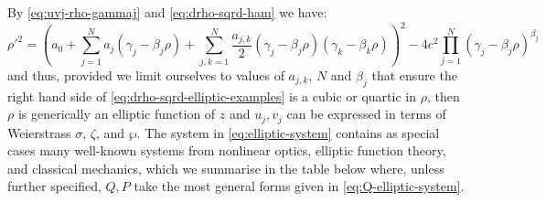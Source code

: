 \documentclass[11pt,a4paper]{article}
\numberwithin{equation}{section}
\begin{document}
By \eqref{eq:uvj-rho-gammaj} and \eqref{eq:drho-sqrd-ham} we have:
\begin{equation}
    \label{eq:drho-sqrd-elliptic-examples}
    \rho'^{2} = \left({a}_{0} + \sum_{j=1}^{N} {a}_{j}\left({\gamma}_{j} - {\beta}_{j} \rho\right) + \sum_{j,k=1}^N \frac{{a}_{j,k}}{2}\left({\gamma}_{j} - {\beta}_{j} \rho\right) \left({\gamma}_{k} - {\beta}_{k} \rho\right) \right)^{2} - 4 c^{2} \prod_{j=1}^{N} \left({\gamma}_{j} - {\beta}_{j} \rho\right)^{{\beta}_{j}}
\end{equation}
and thus, provided we limit ourselves to values of $a_{j,k}$, $N$ and $\beta_j$ that ensure the right hand side of \eqref{eq:drho-sqrd-elliptic-examples} is a cubic or quartic in $\rho$, then $\rho$ is generically an elliptic function of $z$ and $u_j, v_j$ can be expressed in terms of Weierstrass $\sigma$, $\zeta$, and $\wp$. 
The system in \eqref{eq:elliptic-system} contains as special cases many well-known systems from nonlinear optics, elliptic function theory, and classical mechanics, which we summarise in the table below where, unless further specified, $Q, P$ take the most general forms given in \eqref{eq:Q-elliptic-system}.
\end{document}
